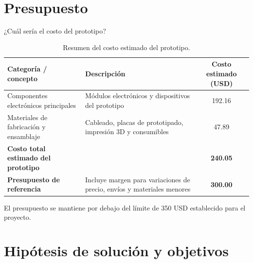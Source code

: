 \documentclass[aspectratio=169]{beamer}
\newcommand{\rightfootertext}{}
\newcommand{\setrightfooter}[1]{\gdef\rightfootertext{#1}}
\begin{document}
\section{Presupuesto}
\begin{frame}{¿Cuál sería el costo del prototipo?}

\begin{table}
\centering
\caption{Resumen del costo estimado del prototipo.}
\label{tab:costo_prototipo_beamer}

\scriptsize
\renewcommand{\arraystretch}{1.25}

\begin{tabular}{p{5.2cm} p{5.2cm} c}
\toprule
\textbf{Categoría / concepto} &
\textbf{Descripción} &
\textbf{Costo estimado (USD)} \\
\midrule

Componentes electrónicos principales &
Módulos electrónicos y dispositivos del prototipo &
192.16 \\

Materiales de fabricación y ensamblaje &
Cableado, placas de prototipado, impresión 3D y consumibles &
47.89 \\

\midrule
\textbf{Costo total estimado del prototipo} &
&
\textbf{240.05} \\

\midrule
\textbf{Presupuesto de referencia} &
Incluye margen para variaciones de precio, envíos y materiales menores &
\textbf{300.00} \\

\bottomrule
\end{tabular}

\end{table}

\centering
\small El presupuesto se mantiene por debajo del límite de 350 USD establecido para el proyecto.

\end{frame}


\setrightfooter{ ¿Qué se espera demostrar?}
\section{Hipótesis de solución y objetivos}
\end{document}
